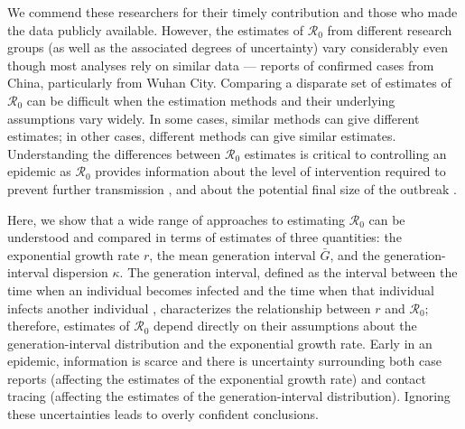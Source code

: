 \documentclass[12pt]{article}
\newcommand{\Ro}{\ensuremath{{\mathcal R}_{0}}\xspace}
\begin{document}
We commend these researchers for their timely contribution and those who made the data publicly available.
However, the estimates of \Ro from different research groups (as well as the associated degrees of uncertainty) vary considerably even though most analyses rely on similar data --- reports of confirmed cases from China, particularly from Wuhan City.
Comparing a disparate set of estimates of \Ro can be difficult when the estimation methods and their underlying assumptions vary widely.
In some cases, similar methods can give different estimates; in other cases, different methods can give similar estimates.
Understanding the differences between \Ro estimates is critical to controlling an epidemic as \Ro provides information about the level of intervention required to prevent further transmission \citep{anderson1991infectious}, and about the potential final size of the outbreak \citep{anderson1991infectious, ma2006generality}.

Here, we show that a wide range of approaches to estimating \Ro can be understood and compared in terms of estimates of three quantities: the exponential growth rate $r$, the mean generation interval $\bar G$, and the generation-interval dispersion $\kappa$.
The generation interval, defined as the interval between the time when an individual becomes infected and the time when that individual infects another individual \citep{svensson2007note}, characterizes the relationship between $r$ and \Ro \citep{wearing2005appropriate, roberts2007model, wallinga2007generation, park2019practical};
therefore, estimates of \Ro depend directly on their assumptions about the generation-interval distribution and the exponential growth rate.
Early in an epidemic, information is scarce and there is uncertainty surrounding both case reports (affecting the estimates of the exponential growth rate) and contact tracing (affecting the estimates of the generation-interval distribution).
Ignoring these uncertainties leads to overly confident conclusions.
\end{document}
